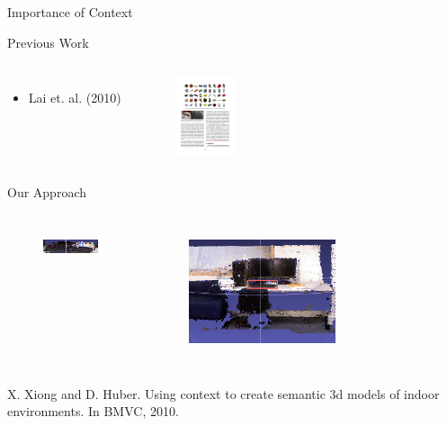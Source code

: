 \documentclass{beamer}
\begin{document}
\begin{frame}{Importance of Context}
\begin{block}{Previous Work}
\begin{columns}[t!]
\vskip -0.2in
\begin{itemize}
\item Lai et. al. (2010)
\end{itemize}
\begin{figure}
\vskip -0.2in
\includegraphics[width=.9\linewidth,height=0.9in]{lai_objects.pdf}
\end{figure}
\end{columns}
\end{block}
\pause
\vskip -0.1in
\begin{block}{Our Approach}

\begin{columns}

\vskip -0.2in
  \begin{figure}
  \includegraphics[width=.7\linewidth]{keyboard.png}\\
  \end{figure}
 
\pause
\vskip -0.2in
  \begin{figure}
  \includegraphics[width=.9\linewidth,height=1.2in]{keyboard_scene.png}\\
  \end{figure}
\end{columns}
\end{block}
{\scriptsize X. Xiong and D. Huber. Using context to create semantic 3d models of indoor environments. In BMVC, 2010.}
\end{frame}
\end{document}
